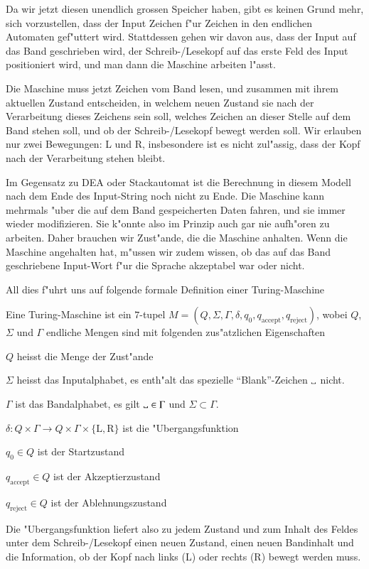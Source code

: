 Da wir jetzt diesen unendlich grossen Speicher haben, gibt es keinen
Grund mehr, sich vorzustellen, dass der Input Zeichen f"ur Zeichen
in den endlichen Automaten gef"uttert wird. Stattdessen gehen wir
davon aus, dass der Input auf das Band geschrieben wird, der 
Schreib-/Lesekopf auf das erste Feld des Input positioniert wird,
und man dann die Maschine arbeiten l"asst.

Die Maschine muss jetzt Zeichen vom Band lesen, und zusammen mit
ihrem aktuellen Zustand entscheiden, in welchem neuen Zustand
sie nach der Verarbeitung dieses Zeichens sein soll, welches Zeichen
an dieser Stelle auf dem Band stehen soll, und ob der Schreib-/Lesekopf
bewegt werden soll. Wir erlauben nur zwei Bewegungen: L und R, insbesondere
ist es nicht zul"assig, dass der Kopf nach der Verarbeitung stehen 
bleibt.

Im Gegensatz zu DEA oder Stackautomat ist die Berechnung in diesem
Modell nach dem Ende des Input-String noch nicht zu Ende. Die Maschine
kann mehrmals "uber die auf dem Band gespeicherten Daten fahren, und
sie immer wieder modifizieren. Sie k"onnte also im Prinzip auch
gar nie aufh"oren zu arbeiten. Daher brauchen wir Zust"ande, die
die Maschine anhalten. Wenn die Maschine angehalten hat, m"ussen wir
zudem wissen, ob das auf das Band geschriebene Input-Wort f"ur die
Sprache akzeptabel war oder nicht. 

All dies f"uhrt uns auf folgende formale Definition einer Turing-Maschine
\begin{definition}
Eine Turing-Maschine ist ein $7$-tupel
$M=(Q,\Sigma,\Gamma,\delta,q_0,q_{\text{accept}},q_{\text{reject}})$,
wobei $Q$, $\Sigma$ und $\Gamma$ endliche Mengen sind mit folgenden
zus"atzlichen Eigenschaften
\begin{compactenum}
\item $Q$ heisst die Menge der Zust"ande
\item $\Sigma$ heisst das Inputalphabet, es enth"alt das spezielle
``Blank''-Zeichen $\blank$ nicht.
\item $\Gamma$ ist das Bandalphabet, es gilt $\blank\in\Gamma$ und
$\Sigma\subset\Gamma$.
\item $\delta\colon Q\times \Gamma\to Q\times\Gamma\times\{\text{L},\text{R}\}$
ist die "Ubergangsfunktion
\item $q_0\in Q$ ist der Startzustand
\item $q_{\text{accept}}\in Q$ ist der Akzeptierzustand
\item $q_{\text{reject}}\in Q$ ist der Ablehnungszustand
\end{compactenum}
\end{definition}
Die "Ubergangsfunktion liefert also zu jedem Zustand und zum
Inhalt des Feldes unter dem Schreib-/Lesekopf einen neuen
Zustand, einen neuen Bandinhalt und die Information, ob
der Kopf nach links (L) oder rechts (R) bewegt werden muss.

